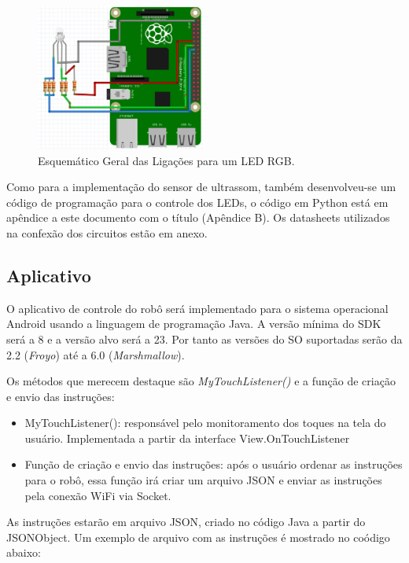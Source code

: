 \begin{figure}[H]
    \centering
    \includegraphics[width=0.5\textwidth]{figuras/esquematico_led.eps}
    \caption{Esquemático Geral das Ligações para um LED RGB.}
    \label{fig:esquematico_led}
\end{figure}

Como para a implementação do sensor de ultrassom, também desenvolveu-se um código de programação para o controle dos LEDs, o código
em Python está em apêndice a este documento com o título (Apêndice B). Os datasheets utilizados na confexão dos circuitos estão em anexo.


\subsection{Aplicativo}

O aplicativo de controle do robô será implementado para o sistema operacional Android usando a linguagem de programação Java. A versão mínima do
SDK será a 8 e a versão alvo será a 23. Por tanto as versões do SO suportadas serão da 2.2 (\textit{Froyo}) até a 6.0 (\textit{Marshmallow}).

Os métodos que merecem destaque são \textit{MyTouchListener()} e a função de criação e envio das instruções:
\begin{itemize}
\item MyTouchListener(): responsável pelo monitoramento dos toques na tela do usuário. Implementada a partir da interface View.OnTouchListener
\item Função de criação e envio das instruções: após o usuário ordenar as instruções para o robô, essa função irá criar um arquivo JSON e enviar as instruções pela conexão WiFi via Socket.
\end{itemize}

As instruções estarão em arquivo JSON, criado no código Java a partir do JSONObject. Um exemplo de arquivo com as instruções é mostrado no coódigo abaixo:

